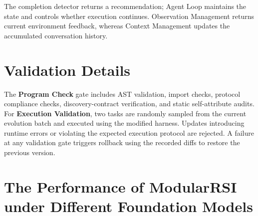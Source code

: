 \documentclass{article} %
\begin{document}
The completion detector returns a recommendation; Agent Loop maintains the state and controls whether execution continues. Observation Management returns current environment feedback, whereas Context Management updates the accumulated conversation history.

\section{Validation Details}
\label{appendix:validation_details}

The \textbf{Program Check} gate includes AST validation, import checks, protocol compliance checks, discovery-contract verification, and static self-attribute audits.
For \textbf{Execution Validation}, two tasks are randomly sampled from the current evolution batch and executed using the modified harness.
Updates introducing runtime errors or violating the expected execution protocol are rejected.
A failure at any validation gate triggers rollback using the recorded diffs to restore the previous version.

\section{The Performance of ModularRSI under Different Foundation Models}
\label{appendix:model_generation}
\end{document}
